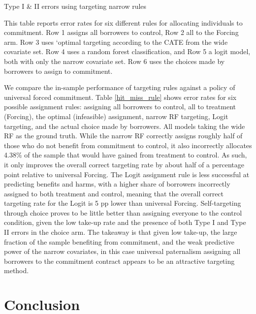 \documentclass[12pt, a4paper]{article}
\begin{document}
\begin{table}
\caption{Type I \& II errors using targeting narrow rules}
\label{hit_miss_rule}
\begin{center}
\footnotesize{}
\end{center}
\footnotesize{This table reports error rates for six different rules for allocating individuals to commitment. Row 1 assigns all borrowers to control, Row 2 all to the Forcing arm. Row 3 uses `optimal targeting according to the CATE from the wide covariate set. Row 4 uses a random forest classification, and Row 5 a logit model, both with only the narrow covariate set.  Row 6 uses the choices made by borrowers to assign to commitment.}
\end{table} 

We compare the in-sample performance of targeting rules against a policy of universal forced commitment. Table \ref{hit_miss_rule} shows error rates for six possible assignment rules: assigning all borrowers to control, all to treatment (Forcing), the optimal (infeasible) assignment, narrow RF targeting, Logit targeting, and the actual choice made by borrowers.  All models taking the wide RF as the ground truth. While the narrow RF correctly assigns roughly half of those who do not benefit from commitment to control, it also incorrectly allocates 4.38\% of the sample that would have gained from treatment to control. As such, it only improves the overall correct targeting rate by about half of a percentage point relative to universal Forcing. The Logit assignment rule is less successful at predicting benefits and harms, with a higher share of borrowers incorrectly assigned to both treatment and control, meaning that the overall correct targeting rate for the Logit is 5 pp lower than universal Forcing.  Self-targeting through choice proves to be little better than assigning everyone to the control condition, given the low take-up rate and the presence of both Type I and Type II errors in the choice arm.  The takeaway is that given low take-up, the large fraction of the sample benefiting from commitment, and the weak predictive power of the narrow covariates, in this case universal paternalism assigning all borrowers to the commitment contract appears to be an attractive targeting method.

    
\section{Conclusion} \label{conclusion}
\end{document}
